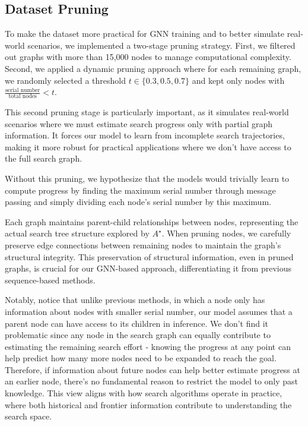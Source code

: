 \documentclass[letterpaper]{article}
\begin{document}
\subsection{Dataset Pruning}

To make the dataset more practical for GNN training and to better simulate real-world scenarios, we implemented a two-stage pruning strategy. First, we filtered out graphs with more than 15,000 nodes to manage computational complexity. Second, we applied a dynamic pruning approach where for each remaining graph, we randomly selected a threshold $t \in \{0.3, 0.5, 0.7\}$ and kept only nodes with $\frac{\text{serial number}}{\text{total nodes}} < t$.

This second pruning stage is particularly important, as it simulates real-world scenarios where we must estimate search progress only with partial graph information. It forces our model to learn from incomplete search trajectories, making it more robust for practical applications where we don't have access to the full search graph.

Without this pruning, we hypothesize that the models would trivially learn to compute progress by finding the maximum serial number through message passing and simply dividing each node's serial number by this maximum.

Each graph maintains parent-child relationships between nodes, representing the actual search tree structure explored by $A^{\star}$. When pruning nodes, we carefully preserve edge connections between remaining nodes to maintain the graph's structural integrity. This preservation of structural information, even in pruned graphs, is crucial for our GNN-based approach, differentiating it from previous sequence-based methods.

Notably, notice that unlike previous methods, in which a node only has information about nodes with smaller serial number, our model assumes that a parent node can have access to its children in inference. We don't find it problematic since any node in the search graph can equally contribute to estimating the remaining search effort - knowing the progress at any point can help predict how many more nodes need to be expanded to reach the goal. Therefore, if information about future nodes can help better estimate progress at an earlier node, there's no fundamental reason to restrict the model to only past knowledge. This view aligns with how search algorithms operate in practice, where both historical and frontier information contribute to understanding the search space.
\end{document}

